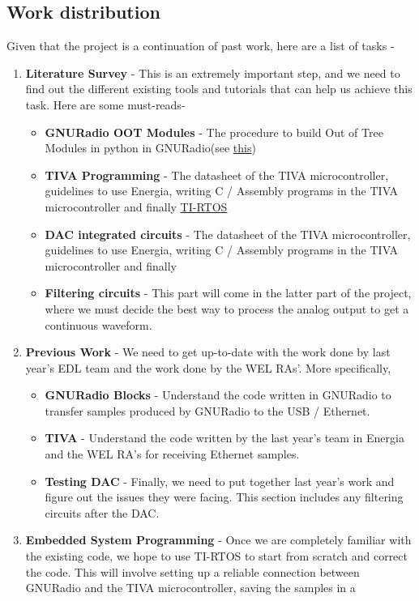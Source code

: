 \documentclass{article}
\begin{document}
\subsection{Work distribution}
Given that the project is a continuation of past work, here are a list of tasks -
\begin{enumerate}
\item \textbf{Literature Survey} - This is an extremely important step, and we need to find out the different existing tools and tutorials that can help us achieve this task. Here are some must-reads-
\begin{itemize}
\item \textbf{GNURadio OOT Modules} - The procedure to build Out of Tree Modules in python in
GNURadio(see \href{http://gnuradio.org/redmine/projects/gnuradio/wiki/Guided_Tutorial_GNU_Radio_in_Python}{this})
\item \textbf{TIVA Programming} - The datasheet of the TIVA microcontroller, guidelines to use
Energia, writing C / Assembly programs in the TIVA microcontroller and finally \href{http://www.ti.com/lit/ug/spruhu5d/spruhu5d.pdf}{TI-RTOS}
\item \textbf{DAC integrated circuits} - The datasheet of the TIVA microcontroller, guidelines to use
Energia, writing C / Assembly programs in the TIVA microcontroller and finally
\item \textbf{Filtering circuits} - This part will come in the latter part of the project, where we must
decide the best way to process the analog output to get a continuous waveform.
\end{itemize}
\item \textbf{Previous Work} - We need to get up-to-date with the work done by last year’s EDL team and
the work done by the WEL RAs’. More specifically,
\begin{itemize}
\item \textbf{GNURadio Blocks} - Understand the code written in GNURadio to transfer samples
produced by GNURadio to the USB / Ethernet.
\item \textbf{TIVA} - Understand the code written by the last year’s team in Energia and the WEL RA’s
for receiving Ethernet samples.
\item \textbf{Testing DAC} - Finally, we need to put together last year’s work and figure out the issues
they were facing. This section includes any filtering circuits after the DAC.
\end{itemize}
\item \textbf{Embedded System Programming} - Once we are completely familiar with the existing code, we hope to use TI-RTOS to start from scratch and correct the code. This will involve setting up a reliable connection between GNURadio and the TIVA microcontroller, saving the samples in a

\end{enumerate}
\end{document}
